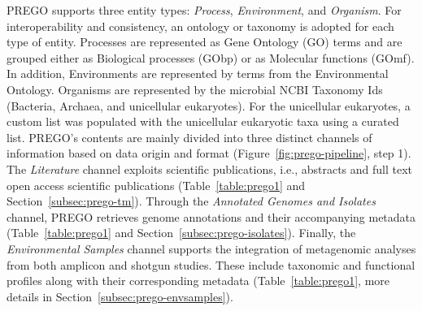    PREGO supports three entity types: \textit{Process}, \textit{Environment}, and \textit{Organism}. 
   For interoperability and consistency, an ontology or taxonomy is adopted for each type of entity.
   Processes are represented as Gene Ontology (GO) terms and are grouped either as Biological processes (GObp) or as Molecular functions (GOmf). 
   In addition, Environments are represented by terms from the Environmental Ontology. 
   Organisms are represented by the microbial NCBI Taxonomy Ids (Bacteria, Archaea, and unicellular eukaryotes). For the unicellular eukaryotes, a custom list was populated with the unicellular eukaryotic taxa using a curated list.
   PREGO's contents are mainly divided into three distinct channels of information based on data origin and format (Figure~\ref{fig:prego-pipeline}, step 1). 
   The \textit{Literature} channel exploits scientific publications, i.e., abstracts and full text open access scientific publications (Table~\ref{table:prego1} and Section~\ref{subsec:prego-tm}). 
   Through the \textit{Annotated Genomes and Isolates} channel, PREGO retrieves genome annotations and their accompanying metadata (Table~\ref{table:prego1} and Section~\ref{subsec:prego-isolates}). 
   Finally, the \textit{Environmental Samples} channel supports the integration of metagenomic analyses from both amplicon and shotgun studies. 
   These include taxonomic and functional profiles along with their corresponding metadata (Table~\ref{table:prego1}, more details in Section~\ref{subsec:prego-envsamples}).


